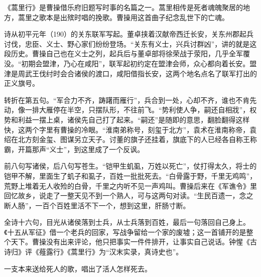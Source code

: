 \begin{appreciation}
《蒿里行》是曹操借乐府旧题写时事的名篇之一。蒿里相传是死者魂魄聚居的地方，蒿里之歌本是出殡时唱的挽歌。曹操用这首曲子纪念乱世下的亡魂。

诗从初平元年（190）的关东联军写起。董卓挟着汉献帝西迁长安，关东州郡起兵讨伐，忠臣、义士、野心家们纷纷登场。“关东有义士，兴兵讨群凶”，讲的就是这段历史。曹操自己也在义士之列，起兵后与董卓部将徐荣战于荥阳，几乎全军覆没。“初期会盟津，乃心在咸阳”，联军起初约定在盟津会师，众心都向着长安。盟津是周武王伐纣时会合诸侯的渡口，咸阳借指长安，这两个地名点名了联军打出的正义旗号。

转折在第五句。“军合力不齐，踌躇而雁行”，兵合到一处，心却不齐，谁也不肯先动，像一排大雁停在半空，只摆队形，不往前飞。“势利使人争，嗣还自相戕”，权势和利益一摆上桌，诸侯先自己打了起来。“嗣还”是随即的意思，翻脸翻得这样快，这两个字里有曹操的冷眼。“淮南弟称号，刻玺于北方”，袁术在淮南称帝，袁绍在北方刻金玺、图谋另立天子。讨董的旗子还挂着，旗底下的人已经各自称王称霸，开篇那声“义士”，到这里成了一个反讽。

前八句写诸侯，后八句写苍生。“铠甲生虮虱，万姓以死亡”，仗打得太久，将士的铠甲不解，里面生了虮子和虱子，百姓一批批死去。“白骨露于野，千里无鸡鸣”，荒野上堆着无人收殓的白骨，千里之内听不见一声鸡叫。曹操后来在《军谯令》里回忆故乡，说走了一整天见不到一个熟人，可与这两句对读。“生民百遗一，念之断人肠”，一百个百姓里活不下一个，想到这里，肝肠寸断。

全诗十六句，目光从诸侯落到士兵，从士兵落到百姓，最后一句落回自己身上。《十五从军征》借一个老兵的回家，写战争留给一个家的废墟；这一首铺开的是整个天下。曹操没有出来评论，他只把事实一件件排开，让事实自己说话。钟惺《古诗归》评《薤露行》《蒿里行》为“汉末实录，真诗史也”。

一支本来送给死人的歌，唱出了活人怎样死去。
\end{appreciation}
